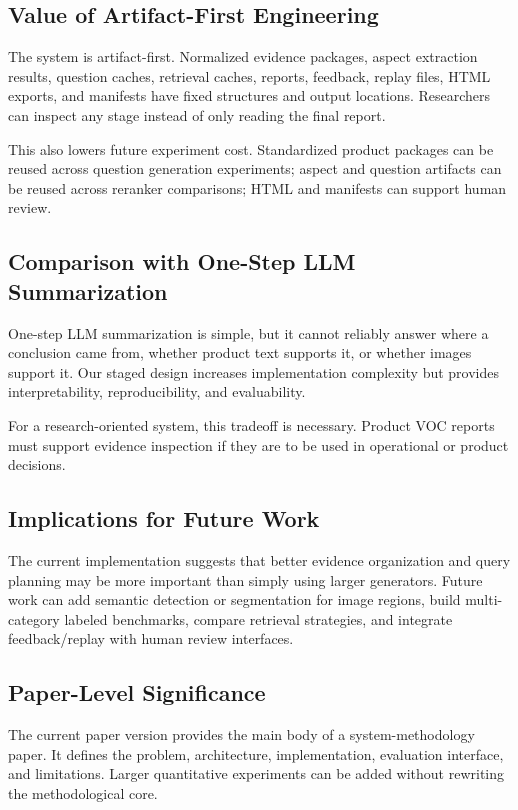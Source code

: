 \documentclass[11pt]{article}
\begin{document}
\subsection{Value of Artifact-First Engineering}

The system is artifact-first. Normalized evidence packages, aspect extraction results, question caches, retrieval caches, reports, feedback, replay files, HTML exports, and manifests have fixed structures and output locations. Researchers can inspect any stage instead of only reading the final report.

This also lowers future experiment cost. Standardized product packages can be reused across question generation experiments; aspect and question artifacts can be reused across reranker comparisons; HTML and manifests can support human review.

\subsection{Comparison with One-Step LLM Summarization}

One-step LLM summarization is simple, but it cannot reliably answer where a conclusion came from, whether product text supports it, or whether images support it. Our staged design increases implementation complexity but provides interpretability, reproducibility, and evaluability.

For a research-oriented system, this tradeoff is necessary. Product VOC reports must support evidence inspection if they are to be used in operational or product decisions.

\subsection{Implications for Future Work}

The current implementation suggests that better evidence organization and query planning may be more important than simply using larger generators. Future work can add semantic detection or segmentation for image regions, build multi-category labeled benchmarks, compare retrieval strategies, and integrate feedback/replay with human review interfaces.

\subsection{Paper-Level Significance}

The current paper version provides the main body of a system-methodology paper. It defines the problem, architecture, implementation, evaluation interface, and limitations. Larger quantitative experiments can be added without rewriting the methodological core.
\end{document}
